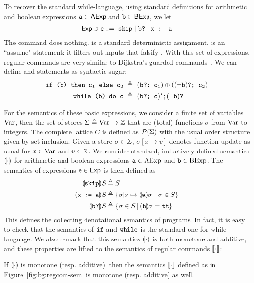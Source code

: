 To recover the standard while-language, using standard definitions for arithmetic and boolean expressions $\texttt{a} \in \mathsf{AExp}$ and $\texttt{b} \in \mathsf{BExp}$, we let
\begin{align*}
	\mathsf{Exp} \ni \mathsf{e} ::= \; \texttt{skip} \mid \texttt{b?} \mid \texttt{x := a}
\end{align*}
The command  does nothing.  is a standard deterministic assignment.  is an ``assume" statement: it filters out inputs that falsify .
With this set of expressions, regular commands are very similar to Dijkstra's guarded commands~\cite{Dijkstra75}.
We can define  and  statements as syntactic sugar:
\begin{align*}
	\code{if (b) then } \code{c}_1 \code{ else } \code{c}_2 & \ \eqdef\  (\code{b?; c}_1) \regplus ((\lnot \code{b})\code{?; c}_2) \\
	\code{while (b) do c}                                   & \ \eqdef\  (\code{b?; c})^\kstar; (\lnot \code{b})\code{?}
\end{align*}

For the semantics of these basic expressions, we consider a finite set of variables $\text{Var}$, then the set of stores $\Sigma \triangleq \text{Var} \rightarrow \mathbb{Z}$ that are (total) functions $\sigma$ from $\text{Var}$ to integers. The complete lattice $C$ is defined as $\mathcal{P}(\Sigma)$ with the usual order structure given by set inclusion. Given a store $\sigma \in \Sigma$, $\sigma[ x \mapsto v ]$ denotes function update as usual for $x \in \text{Var}$ and $v \in \mathbb{Z}$. We consider standard, inductively defined semantics $\llparenthesis\cdot\rrparenthesis$ for arithmetic and boolean expressions $\texttt{a} \in \text{AExp}$ and $\texttt{b} \in \text{BExp}$. The semantics of expressions $\mathsf{e} \in \mathsf{Exp}$ is then defined as
\begin{align*}
	\llparenthesis\texttt{skip}\rrparenthesis S   & \triangleq S                                                                                         \\
	\llparenthesis\texttt{x := a}\rrparenthesis S & \triangleq \left\lbrace \sigma[x \mapsto \llparenthesis\texttt{a}\rrparenthesis \sigma] \,\vert\, \sigma \in S \right\rbrace \\
	\llparenthesis\texttt{b?}\rrparenthesis S     & \triangleq \left\lbrace \sigma \in S \,\vert\, \llparenthesis\texttt{b}\rrparenthesis \sigma = \texttt{tt} \right\rbrace
\end{align*}
This defines the collecting denotational semantics of programs. In fact, it is easy to check that the semantics of $\texttt{if}$ and $\texttt{while}$ is the standard one for while-language. We also remark that this semantics $\llparenthesis\cdot\rrparenthesis$ is both monotone and additive, and these properties are lifted to the semantics of regular commands $\llbracket\cdot\rrbracket$:
\begin{prop}\label{prop:bg:fwsem-monotone}
	If $\llparenthesis\cdot\rrparenthesis$ is monotone (resp. additive), then the semantics $\llbracket\cdot\rrbracket$ defined as in Figure~\ref{fig:bg:regcom-sem} is monotone (resp. additive) as well.
\end{prop}

